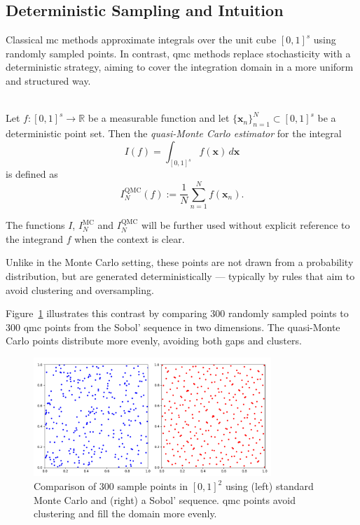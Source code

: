 \subsection{Deterministic Sampling and Intuition}

Classical \ac{mc} methods approximate integrals over the unit cube $[0,1]^s$
using randomly sampled points. In contrast, \ac{qmc} methods replace
stochasticity with a deterministic strategy, aiming to cover the integration
domain in a more uniform and structured way.

\begin{definition} \ \\
Let $f \colon [0,1]^s \to \mathbb{R}$ be a measurable function and let
$\{\boldsymbol{x}_n\}_{n=1}^{N} \subset [0,1]^s$ be a deterministic point set.
Then the \emph{quasi-Monte Carlo estimator} for the integral
\begin{equation*}
    I(f) = \int_{[0,1]^s} f(\boldsymbol{x}) \, d\boldsymbol{x}
\end{equation*}
is defined as
\begin{equation}
I_N^{\mathrm{QMC}}(f) := \frac{1}{N} \sum_{n=1}^{N} f(\boldsymbol{x}_n).
\end{equation}
\end{definition}

The functions $I$, $I_N^{\mathrm{MC}}$ and $I_N^{\mathrm{QMC}}$ will be further
used without explicit reference to the integrand $f$ when the context is clear.

Unlike in the Monte Carlo setting, these points are not drawn from a probability
distribution, but are generated deterministically — typically by rules that aim
to avoid clustering and oversampling.

Figure~\ref{fig:mc-vs-qmc} illustrates this contrast by comparing $300$ randomly
sampled points to $300$ \ac{qmc} points from the Sobol' sequence in two
dimensions. The quasi-Monte Carlo points distribute more evenly, avoiding both
gaps and clusters.

\begin{figure}[H]
  \centering
  \includegraphics[width=0.8\textwidth]{Figures/mc_vs_qmc.png}
  \caption{Comparison of $300$ sample points in $[0,1]^2$ using (left) standard 
  Monte Carlo and (right) a Sobol' sequence. \ac{qmc} points avoid clustering and 
  fill the domain more evenly.}
  \label{fig:mc-vs-qmc}
\end{figure}

